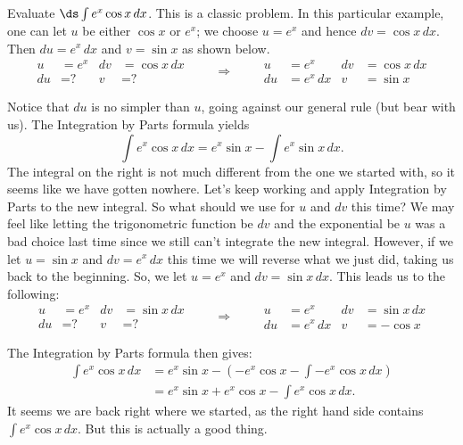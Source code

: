 \begin{example}\label{ex_ibp4}
Evaluate $\ds\int e^x\cos x \,dx$.
\solution
This is a classic problem.
In this particular example, one can let $u$ be either $\cos x$ or $e^x$;
we choose $u=e^x$ and hence $dv = \cos x\,dx$.  Then $du=e^x\,dx$ and $v=\sin x$ as shown below.
\[
\begin{aligned}
u&= e^x & dv&=\cos x\, dx\\
du&= \text{?} & v&=\text{?}
\end{aligned}
\qquad\Rightarrow\qquad
\begin{aligned}
u&= e^x& dv&=\cos x\, dx\\
du&= e^x\, dx & v&=\sin x
\end{aligned}
\]

Notice that $du$ is no simpler than $u$, going against our general rule (but bear with us). The Integration by Parts formula yields
\[\int e^x\cos x\, dx = e^x\sin x - \int e^x\sin x\,dx.\]
The integral on the right is not much different from the one we started with, so it seems like we have gotten nowhere. Let's  keep working and apply Integration by Parts to the new integral. So what should we use for $u$ and $dv$ this time? We may feel like letting the trigonometric function be $dv$ and the exponential be $u$ was a bad choice last time since we still can't integrate the new integral. However, if we let $u=\sin x$ and $dv=e^x\,dx$ this time we will reverse what we just did, taking us back to the beginning. So, we let $u=e^x$ and $dv = \sin x\,dx$. This leads us to the following:
\[
\begin{aligned}
u&= e^x & dv&=\sin x\, dx\\
du&= \text{?} & v&=\text{?}
\end{aligned}
\qquad\Rightarrow\qquad
\begin{aligned}
u&= e^x& dv&=\sin x\, dx\\
du&= e^x\, dx & v&=-\cos x
\end{aligned}
\]

The Integration by Parts formula then gives:
\begin{align*}
\int e^x\cos x\,dx &= e^x\sin x - \left(-e^x\cos x - \int -e^x\cos x\,dx\right)\\
					&= e^x\sin x+ e^x\cos x - \int e^x\cos x\, dx.
\end{align*}
It seems we are back right where we started, as the right hand side contains $\int e^x\cos x\,dx$.  But this is actually a good thing.  


\end{example}
